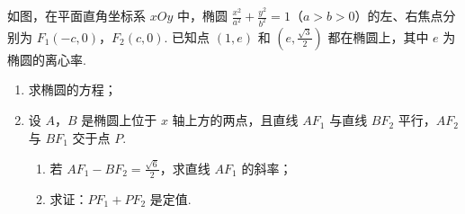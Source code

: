 \begin{problem}
如图，在平面直角坐标系 \(xOy\) 中，椭圆 \(\frac{x^2}{a^2} + \frac{y^2}{b^2} = 1\)（\(a>b>0\)）的左、右焦点分别为 \(F_{1}(-c,0)\)，\(F_{2}(c,0)\). 已知点 \((1,e)\) 和 \(\left(e,\frac{\sqrt{3}}{2}\right)\) 都在椭圆上，其中 \(e\) 为椭圆的离心率.

\begin{enumerate}
\item 求椭圆的方程；
\item 设 \(A\)，\(B\) 是椭圆上位于 \(x\) 轴上方的两点，且直线 \(AF_{1}\) 与直线 \(BF_{2}\) 平行，\(AF_{2}\) 与 \(BF_{1}\) 交于点 \(P\).
\begin{enumerate}
\item 若 \(AF_{1}-BF_{2}=\frac{\sqrt{6}}{2}\)，求直线 \(AF_{1}\) 的斜率；
\item 求证：\(PF_{1}+PF_{2}\) 是定值.
\end{enumerate}
\end{enumerate}

\end{problem}

